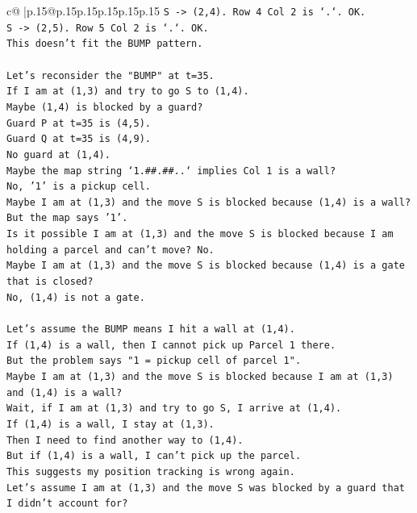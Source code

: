 \documentclass{article}
\begin{document}
{\begin{supertabular}{c@{$\;$}|p{.15\linewidth}@{}p{.15\linewidth}p{.15\linewidth}p{.15\linewidth}p{.15\linewidth}p{.15\linewidth}}
{{{\texttt{S {-}> (2,4). Row 4 Col 2 is `.`. OK.} \\
\texttt{S {-}> (2,5). Row 5 Col 2 is `.`. OK.} \\
\texttt{This doesn't fit the BUMP pattern.} \\
\\ 
\texttt{Let's reconsider the "BUMP" at t=35.} \\
\texttt{If I am at (1,3) and try to go S to (1,4).} \\
\texttt{Maybe (1,4) is blocked by a guard?} \\
\texttt{Guard P at t=35 is (4,5).} \\
\texttt{Guard Q at t=35 is (4,9).} \\
\texttt{No guard at (1,4).} \\
\texttt{Maybe the map string `1.\#\#.\#\#..` implies Col 1 is a wall?} \\
\texttt{No, '1' is a pickup cell.} \\
\texttt{Maybe I am at (1,3) and the move S is blocked because (1,4) is a wall?} \\
\texttt{But the map says '1'.} \\
\texttt{Is it possible I am at (1,3) and the move S is blocked because I am holding a parcel and can't move? No.} \\
\texttt{Maybe I am at (1,3) and the move S is blocked because (1,4) is a gate that is closed?} \\
\texttt{No, (1,4) is not a gate.} \\
\\ 
\texttt{Let's assume the BUMP means I hit a wall at (1,4).} \\
\texttt{If (1,4) is a wall, then I cannot pick up Parcel 1 there.} \\
\texttt{But the problem says "1 = pickup cell of parcel 1".} \\
\texttt{Maybe I am at (1,3) and the move S is blocked because I am at (1,3) and (1,4) is a wall?} \\
\texttt{Wait, if I am at (1,3) and try to go S, I arrive at (1,4).} \\
\texttt{If (1,4) is a wall, I stay at (1,3).} \\
\texttt{Then I need to find another way to (1,4).} \\
\texttt{But if (1,4) is a wall, I can't pick up the parcel.} \\
\texttt{This suggests my position tracking is wrong again.} \\
\texttt{Let's assume I am at (1,3) and the move S was blocked by a guard that I didn't account for?} \\
}}}
\end{supertabular}}
\end{document}
